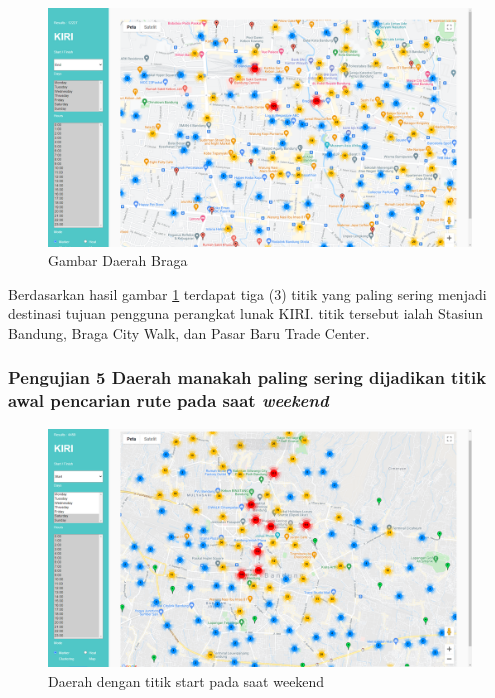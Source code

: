 \begin{figure}[H]
	\centering  
	\includegraphics[scale=0.3]{Gambar/pengujian/bragaZoom.png}  
	\caption[Gambar Daerah Braga ]{Gambar Daerah Braga } 
	\label{fig:bragaZoom}
\end{figure}

Berdasarkan hasil gambar \ref{fig:bragaZoom} terdapat tiga (3) titik yang paling sering menjadi destinasi tujuan pengguna perangkat lunak KIRI. titik tersebut ialah Stasiun Bandung, Braga City Walk, dan Pasar Baru Trade Center.

\subsubsection{Pengujian 5 Daerah manakah  paling sering dijadikan titik awal pencarian rute pada saat \textit{weekend}}
\label{subsec:pengujian5}
\begin{figure}[H]
	\centering  
	\includegraphics[scale=0.3]{Gambar/pengujian/weekend-start.png}  
	\caption[Daerah dengan titik start pada saat weekend]{Daerah dengan titik start pada saat weekend } 
	\label{fig:weekendStart}
\end{figure}

